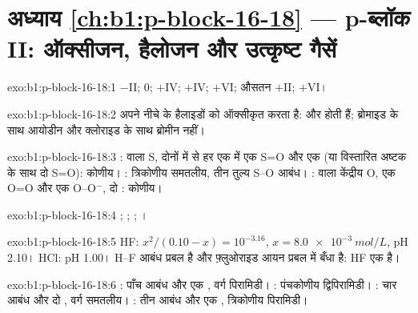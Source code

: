 \section*{अध्याय \ref{ch:b1:p-block-16-18} --- p-ब्लॉक II: ऑक्सीजन, हैलोजन और उत्कृष्ट गैसें}

\begin{solution}{exo:b1:p-block-16-18:1}
 $-$II;  0;  $+$IV;  $+$IV; 
$+$VI;  औसतन $+$II;  $+$VI।
\end{solution}

\begin{solution}{exo:b1:p-block-16-18:2}
 अपने नीचे के हैलाइडों को ऑक्सीकृत करता है:  और
 होती हैं; ब्रोमाइड के साथ आयोडीन और क्लोराइड के साथ
ब्रोमीन नहीं।
\end{solution}

\begin{solution}{exo:b1:p-block-16-18:3}
:  वाला S, दोनों  में से हर एक में एक S=O और एक 
(या विस्तारित अष्टक के साथ दो S=O): कोणीय।
: त्रिकोणीय समतलीय, तीन तुल्य S--O आबंध। :  वाला केंद्रीय O,
एक O=O और एक O--O$^-$, दो : कोणीय।
\end{solution}

\begin{solution}{exo:b1:p-block-16-18:4}
; ;
; ।
\end{solution}

\begin{solution}{exo:b1:p-block-16-18:5}
HF: $x^2/(0.10 - x) = 10^{-3.16}$, $x = \qty{8.0e-3}{mol/L}$, pH 2.10। HCl:
pH 1.00। H--F आबंध प्रबल है और फ़्लुओराइड आयन प्रबल  में बँधा है: HF एक  है।
\end{solution}

\begin{solution}{exo:b1:p-block-16-18:6}
: पाँच आबंध और एक , वर्ग पिरामिडी। :
पंचकोणीय द्विपिरामिडी। : चार आबंध और दो , वर्ग
समतलीय। : तीन आबंध और एक , त्रिकोणीय पिरामिडी।
\end{solution}

